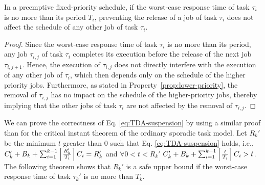 \begin{Lemma}
\label{lemma:remove-same-task}
In a preemptive fixed-priority schedule, if the worst-case response time of task $\tau_i$ is no more than its period $T_i$, preventing the release of a job of task $\tau_i$ does not affect the schedule of any other job of task $\tau_i$.
\end{Lemma}
\begin{proof}
Since the worst-case response time of task $\tau_i$ is no more than its period, any job $\tau_{i,j}$ of task $\tau_i$ completes its execution before the release of the next job $\tau_{i,j+1}$. Hence, the execution of $\tau_{i,j}$ does not directly interfere with the execution of any other job of $\tau_i$, which then depends only on the schedule of the higher priority jobs. Furthermore, as stated in Property~\ref{prop:lower-priority}, the removal of $\tau_{i,j}$ has no impact on the schedule of the higher-priority jobs, thereby implying that the other jobs of task $\tau_i$ are not affected by the removal of $\tau_{i,j}$.
\end{proof}

We can prove the correctness of Eq. \eqref{eq:TDA-suspension} by using a similar proof than for the critical instant theorem of the ordinary sporadic task model.
Let $R_k'$ be the minimum $t$ greater than $0$ such that  Eq. \eqref{eq:TDA-suspension} holds, i.e., $C'_k + B_k + \sum_{i=1}^{k-1}\left\lceil{\frac{R_k'}{T_i}}\right\rceil C_i = R_k'$ and $\forall 0 < t < R_k'$ $C'_k + B_k + \sum_{i=1}^{k-1}\left\lceil{\frac{t}{T_i}}\right\rceil C_i > t$. The following theorem shows that $R_k'$ is a safe upper bound if the worst-case response time of task $\tau_k'$ is no more than $T_k$.

